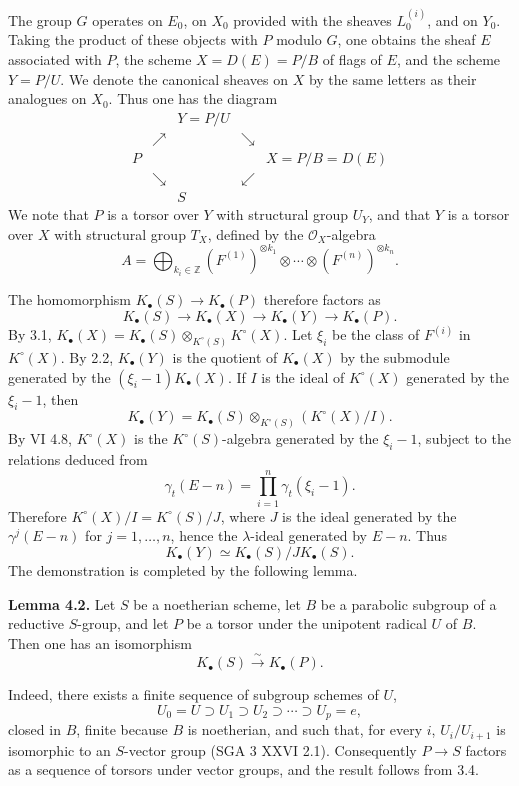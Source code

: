 The group $G$ operates on $E_0$, on $X_0$ provided with the sheaves $L_0^{(i)}$, and on $Y_0$. Taking the product of these objects with $P$ modulo $G$, one obtains the sheaf $E$ associated with $P$, the scheme $X=D(E)=P/B$ of flags of $E$, and the scheme $Y=P/U$. We denote the canonical sheaves on $X$ by the same letters as their analogues on $X_0$. Thus one has the diagram
\[
\begin{array}{ccccc}
&& Y=P/U &&\\[-0.2em]
& \nearrow && \searrow &\\[-0.2em]
P &&&& X=P/B=D(E)\\[-0.2em]
& \searrow && \swarrow &\\[-0.2em]
&& S &&
\end{array}
\]
We note that $P$ is a torsor over $Y$ with structural group $U_Y$, and that $Y$ is a torsor over $X$ with structural group $T_X$, defined by the $\mathcal O_X$-algebra
\[
 A=\bigoplus_{k_i\in\mathbb Z}(F^{(1)})^{\otimes k_1}\otimes\cdots\otimes(F^{(n)})^{\otimes k_n}.
\]

The homomorphism $K_\bullet(S)\to K_\bullet(P)$ therefore factors as
\[
 K_\bullet(S)\longrightarrow K_\bullet(X)\longrightarrow K_\bullet(Y)\longrightarrow K_\bullet(P).
\]
By 3.1, $K_\bullet(X)=K_\bullet(S)\otimes_{K^\circ(S)}K^\circ(X)$. Let $\xi_i$ be the class of $F^{(i)}$ in $K^\circ(X)$. By 2.2, $K_\bullet(Y)$ is the quotient of $K_\bullet(X)$ by the submodule generated by the $(\xi_i-1)K_\bullet(X)$. If $I$ is the ideal of $K^\circ(X)$ generated by the $\xi_i-1$, then
\[
 K_\bullet(Y)=K_\bullet(S)\otimes_{K^\circ(S)}(K^\circ(X)/I).
\]
By VI 4.8, $K^\circ(X)$ is the $K^\circ(S)$-algebra generated by the $\xi_i-1$, subject to the relations deduced from
\[
 \gamma_t(E-n)=\prod_{i=1}^n\gamma_t(\xi_i-1).
\]
Therefore $K^\circ(X)/I=K^\circ(S)/J$, where $J$ is the ideal generated by the $\gamma^j(E-n)$ for $j=1,\ldots,n$, hence the $\lambda$-ideal generated by $E-n$. Thus
\[
 K_\bullet(Y)\simeq K_\bullet(S)/J K_\bullet(S).
\]
The demonstration is completed by the following lemma.

\textbf{Lemma 4.2.} Let $S$ be a noetherian scheme, let $B$ be a parabolic subgroup of a reductive $S$-group, and let $P$ be a torsor under the unipotent radical $U$ of $B$. Then one has an isomorphism
\[
 K_\bullet(S)\xrightarrow{\sim}K_\bullet(P).
\]

Indeed, there exists a finite sequence of subgroup schemes of $U$,
\[
 U_0=U\supset U_1\supset U_2\supset\cdots\supset U_p=e,
\]
closed in $B$, finite because $B$ is noetherian, and such that, for every $i$, $U_i/U_{i+1}$ is isomorphic to an $S$-vector group (SGA 3 XXVI 2.1). Consequently $P\to S$ factors as a sequence of torsors under vector groups, and the result follows from 3.4.

